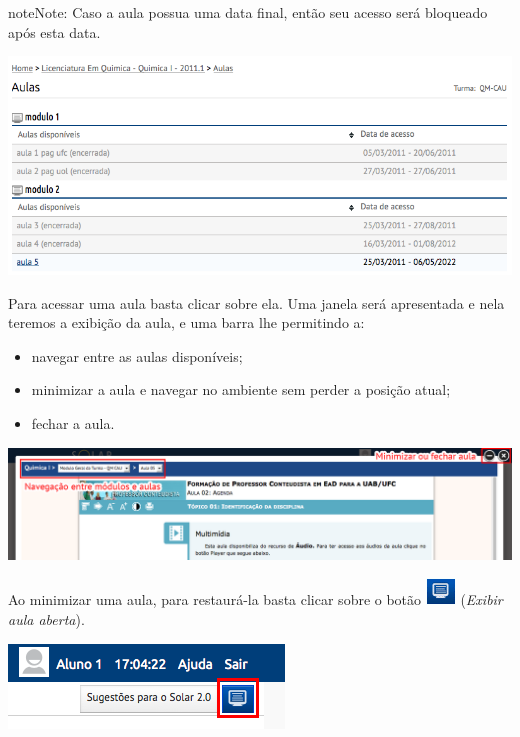 \documentclass[letterpaper,10pt,english]{sphinxmanual}
\begin{document}
\begin{notice}{note}{Note:}
Caso a aula possua uma data final, então seu acesso será bloqueado após esta data.
\end{notice}

{\hfill\includegraphics{lessons-list.png}\hfill}

Para acessar uma aula basta clicar sobre ela. Uma janela será apresentada e nela teremos a exibição da aula, e uma barra lhe permitindo a:
\begin{itemize}
\item {} 
navegar entre as aulas disponíveis;

\item {} 
minimizar a aula e navegar no ambiente sem perder a posição atual;

\item {} 
fechar a aula.

\end{itemize}

{\hfill\includegraphics{lessons-lightbox.png}\hfill}

Ao minimizar uma aula, para restaurá-la basta clicar sobre o botão \includegraphics{lessons-btn-restore.png} (\emph{Exibir aula aberta}).

{\hfill\includegraphics{lessons-restore.png}\hfill}
\end{document}
